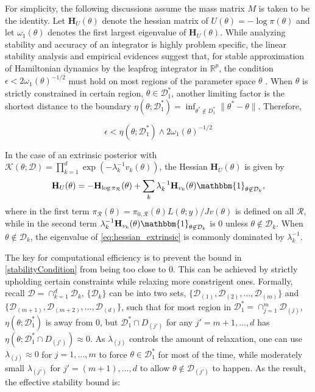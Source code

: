 \documentclass[10pt]{article}
\newcommand{\bb}[1]{\mathbb{#1}}
\newcommand{\mc}[1]{\mathcal{#1}}
\DeclareMathOperator{\1}{\mathbbm{1}}
\newcommand{\dt}{\epsilon} %
\newcommand{\mass}{M} %
\newcommand{\hess}{\mathbf{H}} %
\begin{document}
For simplicity, the following discussions assume the mass matrix $\mass$ is taken to be the identity. Let $\hess_U(\theta)$ denote the hessian matrix of $U(\theta) = - \log \pi(\theta)$ and let $\omega_1(\theta)$ denotes the first largest eigenvalue of $\hess_U(\theta)$. While analyzing stability and accuracy of an integrator is highly problem specific, the linear stability analysis and empirical evidences suggest that, for stable approximation of Hamiltonian dynamics by the leapfrog integrator in $\bb R^p$, the condition $\dt < 2\omega_1(\theta)^{-1/2}$ must hold on most regions of the parameter space $\theta$ \citep{hairer06}.
When $\theta$ is strictly constrained in certain region, $\theta\in \mc D^*_1$, another limiting factor is the shortest distance to the boundary $\eta (\theta; {\mc D^*_1})= \inf_{\theta^*\not\in D_1^*}\|\theta^*-\theta\|$. Therefore,

\begin{equation}
\label{stabilityCondition}
\dt <  \eta (\theta; {\mc D^*_1}) \wedge 2\omega_1(\theta)^{-1/2} 
\end{equation}

In the case of an extrinsic posterior with $\mc K(\theta;\mc D)= \prod_{k=1}^{d} \exp(- \lambda_k^{-1}v_k(\theta))$, the Hessian $\hess_U(\theta)$ is given by
\begin{equation}
\label{eq:hessian_extrinsic}
\hess_U(\theta) = -\hess_{\log \pi_\mc R}(\theta)+\sum_k \lambda_k^{-1} \hess_{v_k}(\theta) \mathbbm{1}_{\theta\not\in \mc D_k},
\end{equation}
where in the first term $\pi_\mc R(\theta)=\pi_{0,\mc R}(\theta)L(\theta;y)/Jv(\theta)$ is defined on all $\mc R$, while in the second term $\lambda_k^{-1} \hess_{v_k}(\theta) \mathbbm{1}_{\theta\not\in \mc D_k}$ is $0$ unless $\theta\not\in \mc D_k$.  When $\theta\not\in \mc D_k$, the eigenvalue of \eqref{eq:hessian_extrinsic} is commonly dominated by $\lambda^{-1}_k$.

The key for computational efficiency is to prevent the bound in \eqref{stabilityCondition} from being too close to $0$. This can be achieved by strictly upholding certain constraints while relaxing more constrigent ones. Formally, recall $\mc D=\cap_{k=1}^d \mc D_k$, $\{\mc D_k\}$ can be into two sets, $\{\mc D_{(1)}, \mc D_{(2)}, \ldots , \mc D_{(m)} \}$ and $\{\mc D_{(m+1)}, \mc D_{(m+2)}, \ldots , \mc D_{(d)} \}$, such that  for most region in $\mc D^*_1= \cap_{j=1}^m \mc D_{(j)}$, $\eta(\theta;{\mc D^*_1})$ is away from $0$, but $\mc D^*_1 \cap D_{(j')}$ for any $j'= m+1, \ldots, d$ has $\eta(\theta; \mc D^*_1 \cap D_{(j')})\approx 0$. As $\lambda_{(j)}$ controls the amount of relaxation, one can use $\lambda_{(j)}\approx 0$ for $j=1,\ldots,m$ to force $\theta \in \mc D_1^*$ for most of the time, while moderately small $\lambda_{(j')}$ for $j'=(m+1),\ldots,d$ to allow $\theta\not \in \mc D_{(j')}$ to happen. As the result, the effective stability bound is:
\end{document}
